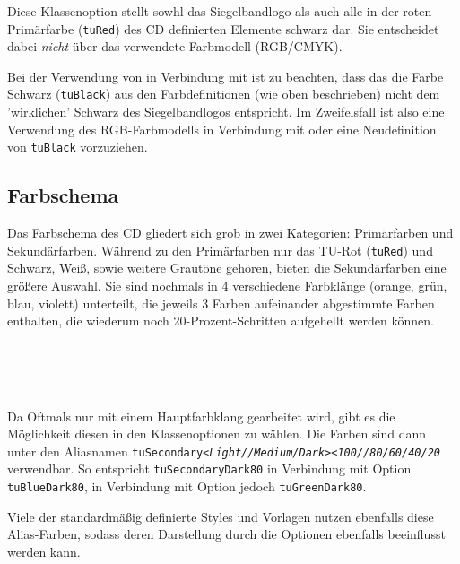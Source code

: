 \begin{Declaration}
\end{Declaration}

Diese Klassenoption stellt sowhl das Siegelbandlogo als auch alle in der
roten Primärfarbe (\texttt{tuRed}) des CD definierten Elemente schwarz dar.
Sie entscheidet dabei \emph{nicht} über das verwendete Farbmodell (RGB/CMYK).
\begin{important}
  Bei der Verwendung von  in Verbindung mit 
  ist zu beachten, dass das die Farbe Schwarz (\texttt{tuBlack})
  aus den Farbdefinitionen (wie oben beschrieben) nicht dem 'wirklichen' Schwarz
  des Siegelbandlogos entspricht.
  Im Zweifelsfall ist also eine Verwendung des RGB-Farbmodells in Verbindung
  mit  oder eine Neudefinition von \texttt{tuBlack} vorzuziehen.
\end{important}

\subsection{Farbschema}

Das Farbschema des CD gliedert sich grob in zwei Kategorien: Primärfarben
und Sekundärfarben. Während zu den Primärfarben nur das TU-Rot (\texttt{tuRed})
und Schwarz, Weiß, sowie weitere Grautöne gehören, bieten die Sekundärfarben
eine größere Auswahl. Sie sind nochmals in 4 verschiedene Farbklänge
(orange, grün, blau, violett) unterteilt, die jeweils 3 Farben aufeinander
abgestimmte Farben enthalten, die wiederum noch 20-Prozent-Schritten aufgehellt
werden können.

\begin{Declaration}
  \\
  \\
  \\
\end{Declaration}

Da Oftmals nur mit einem Hauptfarbklang gearbeitet wird, gibt es die Möglichkeit
diesen in den Klassenoptionen zu wählen. Die Farben sind dann unter den
Aliasnamen
\texttt{tuSecondary\textit{<Light//Medium/Dark>}\textit{<100//80/60/40/20}}
verwendbar.
So entspricht \texttt{tuSecondaryDark80} in Verbindung mit Option
 \texttt{tuBlueDark80}, in Verbindung mit Option 
jedoch \texttt{tuGreenDark80}.

Viele der standardmäßig definierte Styles und Vorlagen nutzen ebenfalls diese
Alias-Farben, sodass deren Darstellung durch die Optionen ebenfalls beeinflusst 
werden kann.

